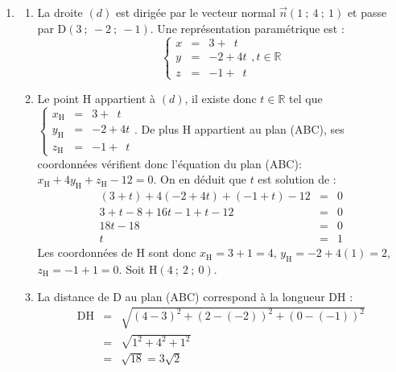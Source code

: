 \documentclass[10pt]{article}
\providecommand{\vect}[1]{\overrightarrow{#1}}
\begin{document}
\begin{enumerate}
\begin{enumerate}
\item Une équation du plan (ABC) est de la forme $x + 4 y + z + d = 0$. Le point A$(1~;~2~;~3)$ appartient au plan, donc :
\[
\begin{array}{rcl}
1 + 4\times 2+ 3 + d &=& 0 \iff 12 + d = 0 \iff d = -12
\end{array}
\]
Une équation cartésienne est : $x + 4y + z - 12 = 0$.
\end{enumerate}
\item 
\begin{enumerate}
\item La droite $(d)$ est dirigée par le vecteur normal $\vect{n}(1~;~4~;~1)$ et passe par D$(3~;~-2~;~-1)$. Une représentation paramétrique est :
\[
\left\{
\begin{array}{rcr}
x &=& 3 + \phantom{4}t \\
y &=& -2 + 4t \\
z &=& -1 + \phantom{4}t
\end{array}
\right. , t \in \mathbb{R}
\]

\item Le point H appartient à $(d)$, il existe donc $t \in \mathbb{R}$ tel que $\left\{ \begin{matrix} x_{\text{H}}&=&3+\phantom{4}t \\y_{\text{H}}&=& -2+4t \\ z_{\text{H}}&=& -1+\phantom{4}t \end{matrix} \right.$. De plus H appartient au plan (ABC), ses coordonnées vérifient donc l'équation du plan (ABC): $x_{\text{H}}+4y_{\text{H}}+z_{\text{H}}- 12 = 0$. On en déduit que $t$ est solution de :
\[
\begin{array}{rcl}
(3 + t) + 4(-2 + 4t) + (-1 + t) - 12 &=& 0 \\
3 + t - 8 + 16t - 1 + t - 12 &=& 0 \\
18t - 18 &=& 0 \\
t &=& 1
\end{array}
\]
Les coordonnées de H sont donc $x_{\text{H}} = 3 + 1 = 4$, $y_{\text{H}} = -2 + 4(1) = 2$, $z_{\text{H}} = -1 + 1 = 0$. Soit H$(4~;~2~;~0)$.

\item La distance de D au plan (ABC) correspond à la longueur DH :
\[
\begin{array}{rcl}
\text{DH} &=& \sqrt{(4 - 3)^2 + (2 - (-2))^2 + (0 - (-1))^2} \\
&=& \sqrt{1^2 + 4^2 + 1^2} \\
&=& \sqrt{18} = 3\sqrt{2}
\end{array}
\]
\end{enumerate}


\end{enumerate}
\end{document}
